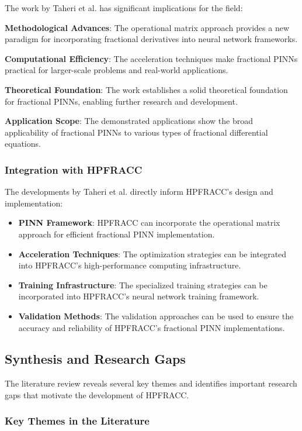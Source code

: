 The work by Taheri et al. has significant implications for the field:

\textbf{Methodological Advances}: The operational matrix approach provides a new paradigm for incorporating fractional derivatives into neural network frameworks.

\textbf{Computational Efficiency}: The acceleration techniques make fractional PINNs practical for larger-scale problems and real-world applications.

\textbf{Theoretical Foundation}: The work establishes a solid theoretical foundation for fractional PINNs, enabling further research and development.

\textbf{Application Scope}: The demonstrated applications show the broad applicability of fractional PINNs to various types of fractional differential equations.

\subsubsection{Integration with HPFRACC}

The developments by Taheri et al. directly inform HPFRACC's design and implementation:

\begin{itemize}
    \item \textbf{PINN Framework}: HPFRACC can incorporate the operational matrix approach for efficient fractional PINN implementation.
    \item \textbf{Acceleration Techniques}: The optimization strategies can be integrated into HPFRACC's high-performance computing infrastructure.
    \item \textbf{Training Infrastructure}: The specialized training strategies can be incorporated into HPFRACC's neural network training framework.
    \item \textbf{Validation Methods}: The validation approaches can be used to ensure the accuracy and reliability of HPFRACC's fractional PINN implementations.
\end{itemize}

\subsection{Synthesis and Research Gaps}

The literature review reveals several key themes and identifies important research gaps that motivate the development of HPFRACC.

\subsubsection{Key Themes in the Literature}

